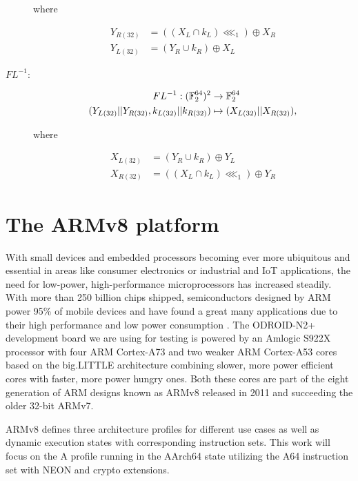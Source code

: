 \begin{description}
where

\begin{align*}
    Y_{R(32)}&=((X_L\cap k_{L})\lll_1)\oplus X_{R} \\
    Y_{L(32)}&=(Y_R\cup k_{R})\oplus X_{L}
\end{align*}

\item[$FL^{-1}$:]

\begin{align*}
    FL^{-1}:(\mathbb{F}_2^{64})^2 &\rightarrow \mathbb{F}_2^{64} \\
    (Y_{L(32)}||Y_{R(32)},k_{L(32)}||k_{R(32)})&\mapsto (X_{L(32)}||X_{R(32)}),
\end{align*}

where

\begin{align*}
    X_{L(32)}&=(Y_R\cup k_{R})\oplus Y_{L} \\
    X_{R(32)}&=((X_L\cap k_{L})\lll_1)\oplus Y_{R}
\end{align*}
\end{description}

\section{The ARMv8 platform}

With small devices and embedded processors becoming ever more ubiquitous and
essential in areas like consumer electronics or industrial and IoT
applications, the need for low-power, high-performance microprocessors has
increased steadily. With more than 250 billion chips shipped, semiconductors
designed by ARM power 95\% of mobile devices and have found a great many
applications due to their high performance and low power consumption
\cite{armcompany}. The ODROID-N2+ \cite{odroidn2} development board we are
using for testing is powered by an Amlogic S922X processor with four ARM
Cortex-A73 and two weaker ARM Cortex-A53 cores based on the big.LITTLE
architecture combining slower, more power efficient cores with faster, more
power hungry ones. Both these cores are part of the eight generation of ARM
designs known as ARMv8 \cite{armv8:2013} released in 2011 and succeeding the
older 32-bit ARMv7.

ARMv8 defines three architecture profiles for different use cases as well as
dynamic execution states with corresponding instruction sets. This work will
focus on the A profile running in the AArch64 state utilizing the A64
instruction set with NEON and crypto extensions.

